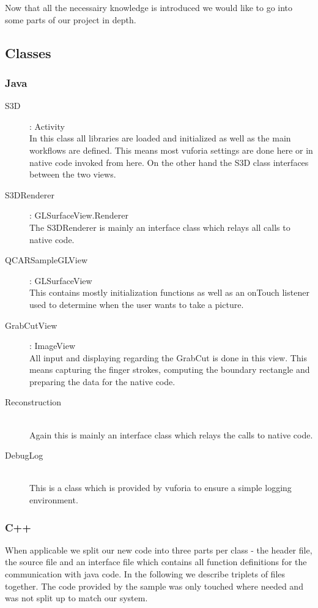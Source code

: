 \documentclass[10pt,twocolumn,letterpaper]{article}
\begin{document}
Now that all the necessairy knowledge is introduced we would like to go into some parts of our project in depth.

\subsection{Classes}
\subsubsection{Java}

\begin{description}
	\item[S3D] : Activity \\
		In this class all libraries are loaded and initialized as well as the main workflows are defined. This means most vuforia settings are done here or in native code invoked from here. On the other hand the S3D class interfaces between the two views.
	\item[S3DRenderer] : GLSurfaceView.Renderer\\
		The S3DRenderer is mainly an interface class which relays all calls to native code.
	\item[QCARSampleGLView] : GLSurfaceView\\
		This contains mostly initialization functions as well as an onTouch listener used to determine when the user wants to take a picture.
	\item[GrabCutView] : ImageView\\
		All input and displaying regarding the GrabCut is done in this view. This means capturing the finger strokes, computing the boundary rectangle and preparing the data for the native code.
	\item[Reconstruction] \quad \\
		Again this is mainly an interface class which relays the calls to native code.
	\item[DebugLog] \quad \\
		This is a class which is provided by vuforia to ensure a simple logging environment.
\end{description}

\subsubsection{C++}
When applicable we split our new code into three parts per class - the header file, the source file and an interface file which contains all function definitions for the communication with java code. In the following we describe triplets of files together. The code provided by the sample was only touched where needed and was not split up to match our system.
\end{document}
